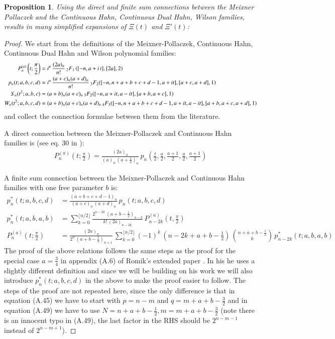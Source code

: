 \documentclass[a4paper,11pt,twoside]{amsart}
\newtheorem{proposition}[theorem]{Proposition}
\newcommand{\verifiedeq}{=}
\newcommand{\defeq}{=}
\newcommand{\verifiedeq}{\stackrel{\checkmark}{=}}
\newcommand{\defeq}{\stackrel{\scriptscriptstyle \textnormal{def}}{=}}
\begin{document}
\begin{proposition}
Using the direct and finite sum connections between the Meixner Pollaczek and the Continuous Hahn, Continuous Dual Hahn, Wilson families, results in many simplified  expansions of $\Xi(t)$ and $\Xi'(t)$: 
\end{proposition}
\begin{proof}  
We start from the definitions of the Meixner-Pollaczek, Continuous Hahn, Continuous Dual Hahn and Wilson polynomial families:
\begin{align}
  P_n^{(a)}\left(t;\frac{\pi}{2}\right) &\defeq i^n\,\frac{(2a)_n}{n!}\,{}_2F_1\left([-n, a+i\,t],[2a],2\right) \notag \\ 
  p_n(t;a,b,c,d) &\defeq i^n\,\frac{(a+c)_n(a+d)_n}{n!}\, {}_3F_2([-n, n+ a+b+c+d-1,a+it], [a+c, a+d], 1) \notag \\
  S_n(t^2;a,b,c) &\defeq (a+b)_n(a+c)_n\, {}_3F_2([-n,a+it, a- it], [a+b, a+c], 1) \notag\\
  W_n(t^2;a,b,c,d) &\defeq (a+b)_n(a+c)_n(a+d)_n\,{}_4F_3([-n, n+ a+b+c+d-1,a+it, a- it], [a+b, a+c, a+d], 1) \notag
\end{align}
and collect the connection formulae between them from the literature.


A direct connection between the Meixner-Pollaczek and Continuous Hahn families is (see eq. 30 in \cite{koesup}):
\begin{align}
 P_n^{(a)}\left(t;\frac{\pi}{2}\right) \defeq \frac{(2a)_n}{(a)_n\,\left(a+\frac12\right)_n}\,p_n\left(\frac{t}{2},\frac{a}{2},\frac{a+1}{2},\frac{a}{2},\frac{a+1}{2}\right) \label{con1}
\end{align}

A finite sum connection between the Meixner-Pollaczek and Continuous Hahn families with one free parameter $b$ is: 
\begin{align}
 p^*_n(t;a,b,c,d) &\defeq \frac{(a+b+c+d-1)_n}{(a+c)_n\,(a+d)_n}\,p_n(t;a,b,c,d) \\
p^*_n(t;a,b,a,b) &\defeq \sum_{k=0}^{\lfloor n/2\rfloor} \frac{2^{n-2k}\,\left(a+b-\frac12\right)_{n-k}}{k!\,(2a)_{n-2k}}\,P_{n-2k}^{(a)}\left(t,\frac{\pi}{2}\right) \\ 
P_n^{(a)}\left(t;\frac{\pi}{2}\right) &\defeq \frac{(2a)_n}{2^n\,\left(a+b-\frac12\right)_{n+1}}\,\sum_{k=0}^{\lfloor n/2\rfloor} (-1)^k\,\left(n-2k+a+b-\frac12\right)\,\binom{n+a+b-\frac12}{k}\,p^*_{n-2k}(t;a,b,a,b) \label{con2}
\end{align}
The proof of the above relations follows the same steps as the proof for the special case $a=\frac34$ in appendix (A.6) of Romik's extended paper \cite{rom}. In his he uses a slightly different definition and since we will be building on his work we will also introduce $p^*_n(t;a,b,c,d)$ in the above to make the proof easier to follow. The steps of the proof are not repeated here, since the only difference is that in equation (A.45) we have to start with $p\verifiedeq n-m$ and $q\verifiedeq m+a+b-\frac32$ and in equation (A.49) we have to use $N \verifiedeq n + a+b - \frac12, m \verifiedeq m +a+b-\frac32$ (note there is an innocent typo in (A.49), the last factor in the RHS should be $2^{n-m-1}$ instead of $2^{n-m+1}$).


\end{proof}
\end{document}

